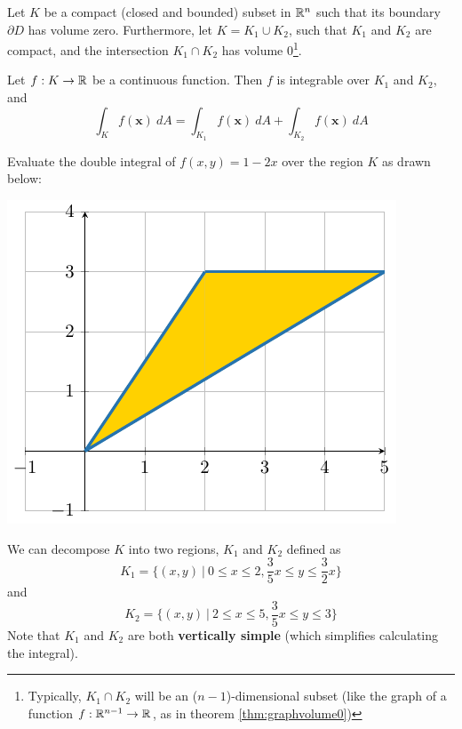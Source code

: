 \begin{theorem}
        Let $K$ be a compact (closed and bounded) subset in $\mathbb{R}^n$ such that its boundary $\partial D$ has volume zero.  Furthermore, let $K = K_1 \cup K_2$, such that $K_1$ and $K_2$ are compact, and the intersection $K_1 \cap K_2$ has volume 0\footnote{Typically, $K_1 \cap K_2$ will be an ($n-1$)-dimensional subset (like the graph of a function $f : \mathbb{R}^{n-1} \to \mathbb{R}$, as in theorem \ref{thm:graphvolume0})}. 
    
    
    Let $f : K \to \mathbb{R}$ be a continuous function.  Then $f$ is integrable over $K_1$ and $K_2$, and 
    $$\int_K f(\bm{x}) \ dA = \int_{K_1} f(\bm{x}) \ dA + \int_{K_2} f(\bm{x}) \ dA $$ 
    \end{theorem}

\begin{example}
    Evaluate the double integral of $f(x,y) = 1-2x$ over the region $K$ as drawn below:

    \begin{center}
        \includegraphics{chapters/4-IntegrationRn/figures/figures-decomposek.pdf}
    \end{center}

    We can decompose $K$ into two regions, $K_1$ and $K_2$ defined as $$K_1 = \{(x,y) \ | \ 0 \leq x \leq 2, \frac{3}{5}x \leq y \leq \frac{3}{2}x\}$$ and 
    $$K_2 = \{(x,y) \ | \ 2 \leq x \leq 5, \frac{3}{5}x \leq y \leq 3 \}$$  
    Note that $K_1$ and $K_2$ are both \textbf{vertically simple} (which simplifies calculating the integral). 


\end{example}
